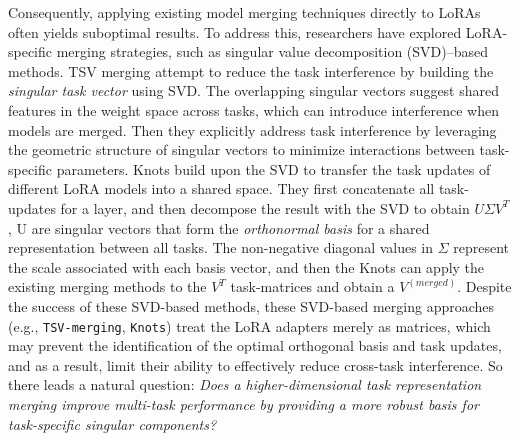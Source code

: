 \documentclass[10pt]{article} %
\begin{document}
    Consequently, applying existing model merging techniques directly to LoRAs often yields suboptimal results. To address this, researchers have explored LoRA-specific merging strategies, such as singular value decomposition (SVD)–based methods. TSV merging \citet{gargiulo2025task} attempt to reduce the task interference by building the \textit{singular task vector} using SVD. The overlapping singular vectors suggest shared features in the weight space across tasks, which can introduce interference when models are merged. Then they explicitly address task interference by leveraging the geometric structure of singular vectors to minimize interactions between task-specific parameters. Knots \citet{stoica2025model} build upon the SVD to transfer the task updates of different LoRA models into a shared space. They first concatenate all task-updates for a layer, and then decompose the result with the SVD to obtain $U\Sigma V^T$, U are singular vectors that form the \textit{orthonormal basis} for a shared representation between all tasks. The non-negative diagonal values in $\Sigma$ represent the scale associated with each basis vector, and then the Knots can apply the existing merging methods to the $V^T$ task-matrices and obtain a $V^{(merged)}$. Despite the success of these SVD-based methods, these SVD-based merging approaches (e.g., \texttt{TSV-merging}, \texttt{Knots}) treat the LoRA adapters merely as matrices, which may prevent the identification of the optimal orthogonal basis and task updates, and as a result, limit their ability to effectively reduce cross-task interference. So there leads a natural question: \textit{Does a higher-dimensional task representation merging improve multi-task performance by providing a more robust basis for task-specific singular components?} 
\end{document}
